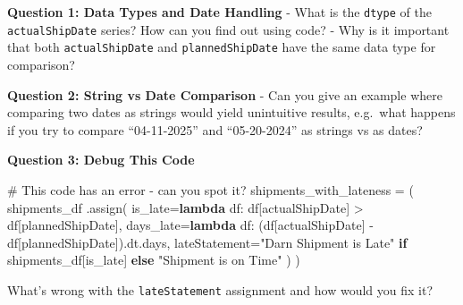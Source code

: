 \documentclass[
  letterpaper,
  DIV=11,
  numbers=noendperiod]{scrartcl}
\newenvironment{Shaded}{\begin{snugshade}}{\end{snugshade}}
\newcommand{\CommentTok}[1]{\textcolor[rgb]{0.37,0.37,0.37}{#1}}
\newcommand{\ControlFlowTok}[1]{\textcolor[rgb]{0.00,0.23,0.31}{\textbf{#1}}}
\newcommand{\KeywordTok}[1]{\textcolor[rgb]{0.00,0.23,0.31}{\textbf{#1}}}
\newcommand{\NormalTok}[1]{\textcolor[rgb]{0.00,0.23,0.31}{#1}}
\newcommand{\OperatorTok}[1]{\textcolor[rgb]{0.37,0.37,0.37}{#1}}
\newcommand{\StringTok}[1]{\textcolor[rgb]{0.13,0.47,0.30}{#1}}
\begin{document}
\begin{tcolorbox}[enhanced jigsaw, bottomtitle=1mm, opacitybacktitle=0.6, toptitle=1mm, colbacktitle=quarto-callout-important-color!10!white, breakable, coltitle=black, bottomrule=.15mm, left=2mm, colframe=quarto-callout-important-color-frame, colback=white, title=\textcolor{quarto-callout-important-color}{\faExclamation}\hspace{0.5em}{🤔 Discussion Questions: Assign Mental Model}, leftrule=.75mm, arc=.35mm, rightrule=.15mm, opacityback=0, toprule=.15mm, titlerule=0mm]

\textbf{Question 1: Data Types and Date Handling} - What is the
\texttt{dtype} of the \texttt{actualShipDate} series? How can you find
out using code? - Why is it important that both \texttt{actualShipDate}
and \texttt{plannedShipDate} have the same data type for comparison?

\textbf{Question 2: String vs Date Comparison} - Can you give an example
where comparing two dates as strings would yield unintuitive results,
e.g.~what happens if you try to compare ``04-11-2025'' and
``05-20-2024'' as strings vs as dates?

\textbf{Question 3: Debug This Code}

\begin{Shaded}
\begin{Highlighting}[]
\CommentTok{\# This code has an error {-} can you spot it?}
\NormalTok{shipments\_with\_lateness }\OperatorTok{=}\NormalTok{ (}
\NormalTok{    shipments\_df}
\NormalTok{    .assign(}
\NormalTok{        is\_late}\OperatorTok{=}\KeywordTok{lambda}\NormalTok{ df: df[}\StringTok{\textquotesingle{}actualShipDate\textquotesingle{}}\NormalTok{] }\OperatorTok{\textgreater{}}\NormalTok{ df[}\StringTok{\textquotesingle{}plannedShipDate\textquotesingle{}}\NormalTok{],}
\NormalTok{        days\_late}\OperatorTok{=}\KeywordTok{lambda}\NormalTok{ df: (df[}\StringTok{\textquotesingle{}actualShipDate\textquotesingle{}}\NormalTok{] }\OperatorTok{{-}}\NormalTok{ df[}\StringTok{\textquotesingle{}plannedShipDate\textquotesingle{}}\NormalTok{]).dt.days,}
\NormalTok{        lateStatement}\OperatorTok{=}\StringTok{"Darn Shipment is Late"} \ControlFlowTok{if}\NormalTok{ shipments\_df[}\StringTok{\textquotesingle{}is\_late\textquotesingle{}}\NormalTok{] }\ControlFlowTok{else} \StringTok{"Shipment is on Time"}
\NormalTok{    )}
\NormalTok{)}
\end{Highlighting}
\end{Shaded}

What's wrong with the \texttt{lateStatement} assignment and how would
you fix it?

\end{tcolorbox}
\end{document}
